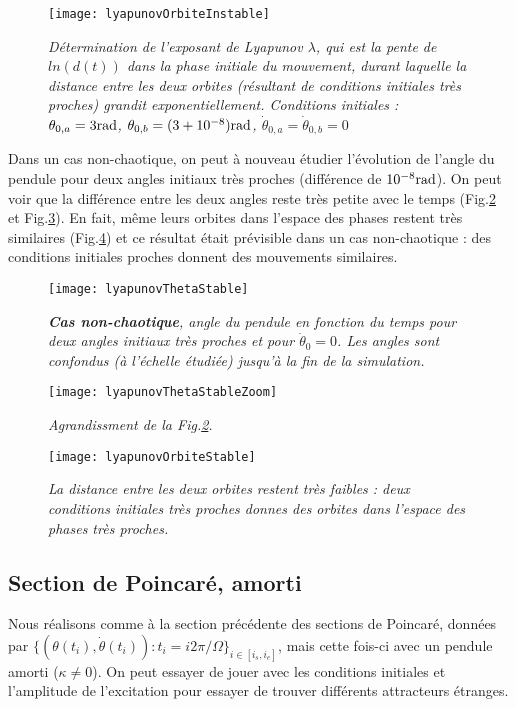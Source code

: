 \documentclass[a4paper,12pt,oneside]{article}
\def \t {\theta}
\def \vt {\Dot{\theta}}
\begin{document}
\begin{figure}[H]
    \centerline{\texttt{[image: lyapunovOrbiteInstable]}}
\caption{ \label{lyapunovOrbiteInstable}\em
Détermination de l'exposant de Lyapunov $\lambda$, qui est la pente de $ln(d(t))$ dans la phase initiale du mouvement, durant laquelle la distance entre les deux orbites (résultant de conditions initiales très proches) grandit exponentiellement.  Conditions initiales : $\t_{0,a}=3\rm{rad}$, $\t_{0,b}=(3+10^{-8})\rm{rad}$, $\vt_{0,a}=\vt_{0,b}=0$
}
\end{figure}
Dans un cas non-chaotique, on peut à nouveau étudier l'évolution de l'angle du pendule pour deux angles initiaux très proches (différence de $10^{-8}\rm{rad}$). On peut voir que la différence entre les deux angles reste très petite avec le temps (Fig.\ref{lyapunovThetaStable} et Fig.\ref{lyapunovThetaStableZoom}). En fait, même leurs orbites dans l'espace des phases restent très similaires (Fig.\ref{lyapunovOrbiteStable}) et ce résultat était prévisible dans un cas non-chaotique : des conditions initiales proches donnent des mouvements similaires. 
\begin{figure}[H]
    \centerline{\texttt{[image: lyapunovThetaStable]}}
\caption{ \label{lyapunovThetaStable}\em
\textbf{Cas non-chaotique}, angle du pendule en fonction du temps pour deux angles initiaux très proches et pour $\vt_0=0$. Les angles sont confondus (à l'échelle étudiée) jusqu'à la fin de la simulation.
}
\end{figure}

\begin{figure}[H]
    \centerline{\texttt{[image: lyapunovThetaStableZoom]}}
\caption{ \label{lyapunovThetaStableZoom}\em
Agrandissment de la Fig.\ref{lyapunovThetaStable}.
}
\end{figure}

\begin{figure}[H]
    \centerline{\texttt{[image: lyapunovOrbiteStable]}}
\caption{ \label{lyapunovOrbiteStable}\em
La distance entre les deux orbites restent très faibles : deux conditions initiales très proches donnes des orbites dans l'espace des phases très proches.
}
\end{figure}

\subsection{Section de Poincaré, amorti}
Nous réalisons comme à la section précédente des sections de Poincaré, données par $\{(\t(t_i),\vt(t_i)) : t_i=i2\pi/\Omega \}_{i \in [i_s,i_e]}$, mais cette fois-ci avec un pendule amorti ($\kappa \neq 0$). On peut essayer de jouer avec les conditions initiales et l'amplitude de l'excitation pour essayer de trouver différents attracteurs étranges. 
\end{document}
